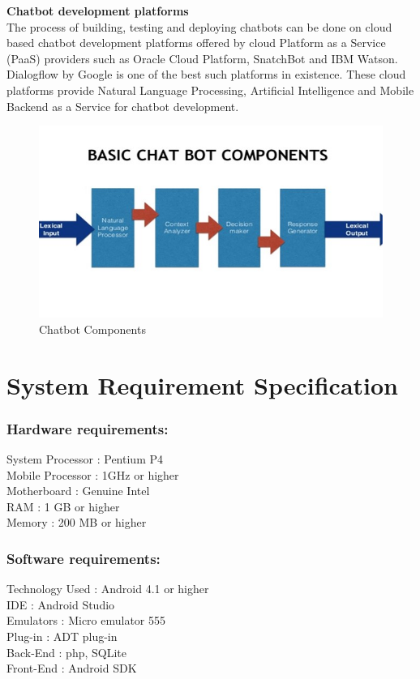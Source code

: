 {\bf Chatbot development platforms}\\
The process of building, testing and deploying chatbots can be done on cloud based chatbot development platforms offered by cloud Platform as a Service (PaaS) providers such as Oracle Cloud Platform, SnatchBot and IBM Watson. Dialogflow by Google is one of the best such platforms in existence. These cloud platforms provide Natural Language Processing, Artificial Intelligence and Mobile Backend as a Service for chatbot development.

\begin{figure}[h]
	\label{ss}    %
	\centering
	\includegraphics[width= 9 cm]{chatbotdiagram.jpg}
	\caption{ Chatbot Components}
\end{figure}

\section{System Requirement Specification}


\subsubsection{Hardware requirements:}

System Processor : Pentium P4\\
Mobile Processor : 1GHz or higher\\
Motherboard : Genuine Intel\\
RAM : 1 GB or higher\\ Memory : 200 MB or higher

\subsubsection{Software requirements:}


Technology Used : Android 4.1 or higher\\
IDE : Android Studio\\
Emulators : Micro emulator 555\\
Plug-in : ADT plug-in\\
Back-End : php, SQLite\\
Front-End : Android SDK\\


